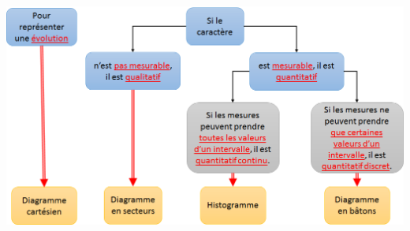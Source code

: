 \documentclass[12pt,a4paper]{article}
\begin{document}












\begin{center}
	\includegraphics[scale=0.78]{img/bilan}
\end{center}
\end{document}
